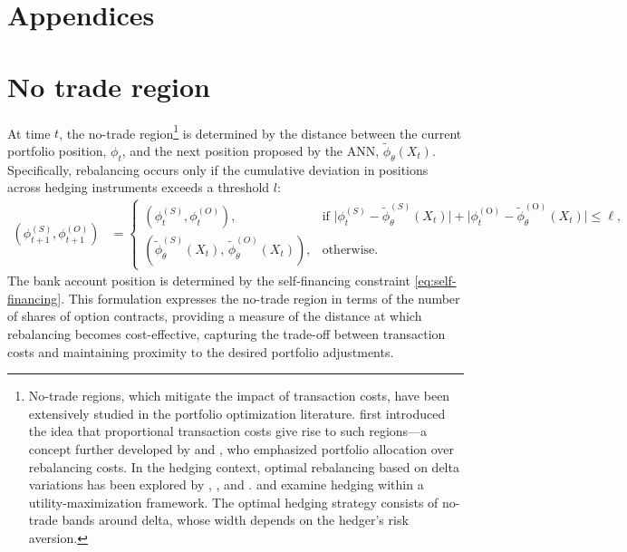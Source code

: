 \documentclass[12pt]{article}
\begin{document}



\appendix
\section*{Appendices}



\section{No trade region}
\label{A No trade region}

At time $t$, the no-trade region\footnote{
    No-trade regions, which mitigate the impact of transaction costs, have been extensively studied in the portfolio optimization literature. \cite{george_capital_cost} first introduced the idea that proportional transaction costs give rise to such regions—a concept further developed by \cite{davis_norman_1990} and \cite{balduzzi1999transaction}, who emphasized portfolio allocation over rebalancing costs. In the hedging context, optimal rebalancing based on delta variations has been explored by \cite{henrotte1993transaction}, \cite{toft1996mean}, and \cite{martellini2002competing}. \cite{hodges1989optimal} and \cite{clewlow1997optimal} examine hedging within a utility-maximization framework. The optimal hedging strategy consists of no-trade bands around delta, whose width depends on the hedger's risk aversion.
    }  is determined by the distance between the current portfolio position, $\phi_t$, and the next position proposed by the ANN, $\tilde{\phi}_{\theta}(X_t)$. Specifically, rebalancing occurs only if the cumulative deviation in positions across hedging instruments exceeds a threshold $l$:
\begin{align}\label{eq:association_rule}
    (\phi^{(S)}_{t+1}, \phi^{(O)}_{t+1}) &= 
    \begin{cases} 
        (\phi^{(S)}_{t}, \phi^{(O)}_{t}), & \text{if } \lvert \phi_{t}^{(S)} - \tilde{\phi}_{\theta}^{(S)}(X_{t}) \rvert + \lvert \phi^{(\text{O})}_{t} - \tilde{\phi}_{\theta}^{(\text{O})}(X_{t}) \rvert \leq \ell, \\[8pt]
        \left(\tilde{\phi}^{(S)}_{\theta}(X_{t}),\, \tilde{\phi}^{(O)}_{\theta}(X_{t}) \right), & \text{otherwise}.
    \end{cases}
\end{align}
The bank account position is determined by the self-financing constraint \eqref{eq:self-financing}. This formulation expresses the no-trade region in terms of the number of shares of option contracts, providing a measure of the distance at which rebalancing becomes cost-effective, capturing the trade-off between transaction costs and maintaining proximity to the desired portfolio adjustments.
\end{document}
